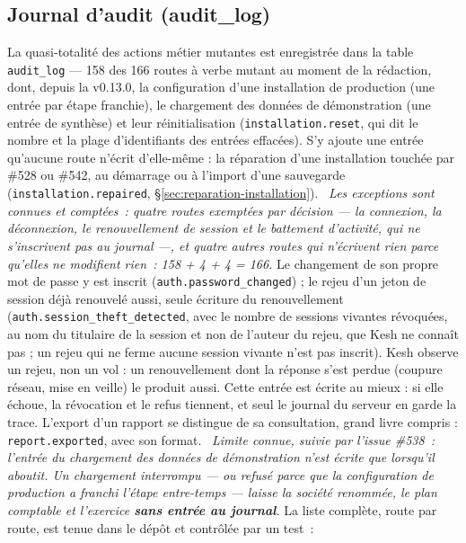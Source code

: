 \documentclass[a4paper,11pt,oneside]{article}
\begin{document}
\subsection{Journal d'audit (audit\_log)}
\label{sec:conformite-audit}

\begin{sloppypar}
La quasi-totalité des actions métier mutantes est enregistrée dans la table \texttt{audit\_log} --- 158 des 166 routes à verbe mutant au moment de la rédaction, dont, depuis la v0.13.0, la configuration d'une installation de production (une entrée par étape franchie), le chargement des données de démonstration (une entrée de synthèse) et leur réinitialisation (\texttt{installation.reset}, qui dit le nombre et la plage d'identifiants des entrées effacées). S'y ajoute une entrée qu'aucune route n'écrit d'elle-même : la réparation d'une installation touchée par \#528 ou \#542, au démarrage ou à l'import d'une sauvegarde (\texttt{installation.repaired}, \S\ref{sec:reparation-installation}). \keshAttention\ \emph{Les exceptions sont connues et comptées~: quatre routes exemptées par décision --- la connexion, la déconnexion, le renouvellement de session et le battement d'activité, qui ne s'inscrivent pas au journal ---, et quatre autres routes qui n'écrivent rien parce qu'elles ne modifient rien~: 158 + 4 + 4 = 166.} Le changement de son propre mot de passe y est inscrit (\texttt{auth.password\_changed}) ; le rejeu d'un jeton de session déjà renouvelé aussi, seule écriture du renouvellement (\texttt{auth.session\_theft\_detected}, avec le nombre de sessions vivantes révoquées, au nom du titulaire de la session et non de l'auteur du rejeu, que Kesh ne connaît pas ; un rejeu qui ne ferme aucune session vivante n'est pas inscrit). Kesh observe un rejeu, non un vol : un renouvellement dont la réponse s'est perdue (coupure réseau, mise en veille) le produit aussi. Cette entrée est écrite au mieux : si elle échoue, la révocation et le refus tiennent, et seul le journal du serveur en garde la trace. L'export d'un rapport se distingue de sa consultation, grand livre compris : \texttt{report.exported}, avec son format. \keshAttention\ \emph{Limite connue, suivie par l'issue \#538~: l'entrée du chargement des données de démonstration n'est écrite que lorsqu'il aboutit. Un chargement interrompu --- ou refusé parce que la configuration de production a franchi l'étape entre-temps --- laisse la société renommée, le plan comptable et l'exercice \textbf{sans entrée au journal}.} La liste complète, route par route, est tenue dans le dépôt et contrôlée par un test~:
\end{sloppypar}
\end{document}
